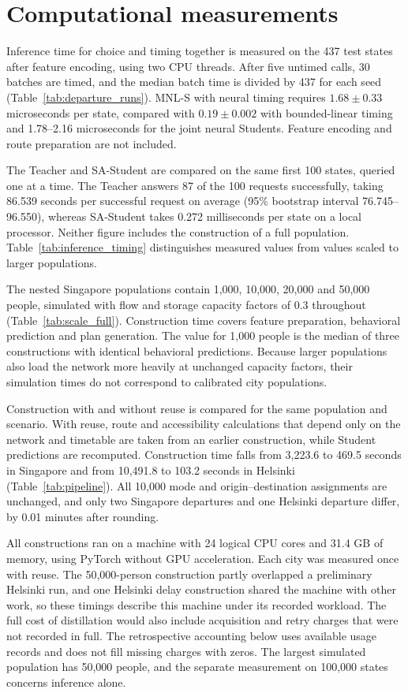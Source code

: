 \section{Computational measurements}
\label{sec:supp_compute}
Inference time for choice and timing together is measured on the 437 test states after feature encoding, using two CPU threads. After five untimed calls, 30 batches are timed, and the median batch time is divided by 437 for each seed (Table~\ref{tab:departure_runs}). MNL-S with neural timing requires $1.68\pm0.33$ microseconds per state, compared with $0.19\pm0.002$ with bounded-linear timing and 1.78--2.16 microseconds for the joint neural Students. Feature encoding and route preparation are not included.

The Teacher and SA-Student are compared on the same first 100 states, queried one at a time. The Teacher answers 87 of the 100 requests successfully, taking 86.539 seconds per successful request on average (95\% bootstrap interval 76.745--96.550), whereas SA-Student takes 0.272 milliseconds per state on a local processor. Neither figure includes the construction of a full population. Table~\ref{tab:inference_timing} distinguishes measured values from values scaled to larger populations.


The nested Singapore populations contain 1,000, 10,000, 20,000 and 50,000 people, simulated with flow and storage capacity factors of 0.3 throughout (Table~\ref{tab:scale_full}). Construction time covers feature preparation, behavioral prediction and plan generation. The value for 1,000 people is the median of three constructions with identical behavioral predictions. Because larger populations also load the network more heavily at unchanged capacity factors, their simulation times do not correspond to calibrated city populations.


Construction with and without reuse is compared for the same population and scenario. With reuse, route and accessibility calculations that depend only on the network and timetable are taken from an earlier construction, while Student predictions are recomputed. Construction time falls from 3,223.6 to 469.5 seconds in Singapore and from 10,491.8 to 103.2 seconds in Helsinki (Table~\ref{tab:pipeline}). All 10,000 mode and origin--destination assignments are unchanged, and only two Singapore departures and one Helsinki departure differ, by 0.01 minutes after rounding.

All constructions ran on a machine with 24 logical CPU cores and 31.4 GB of memory, using PyTorch without GPU acceleration. Each city was measured once with reuse. The 50,000-person construction partly overlapped a preliminary Helsinki run, and one Helsinki delay construction shared the machine with other work, so these timings describe this machine under its recorded workload. The full cost of distillation would also include acquisition and retry charges that were not recorded in full. The retrospective accounting below uses available usage records and does not fill missing charges with zeros. The largest simulated population has 50,000 people, and the separate measurement on 100,000 states concerns inference alone.
\FloatBarrier

